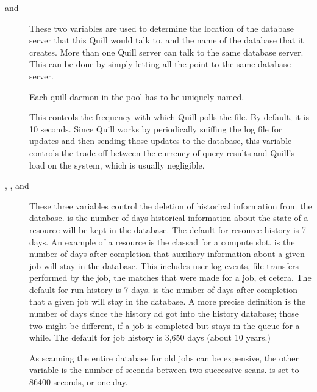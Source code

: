 \begin{description}

\item[ and ]
These two variables are used to determine the location of the database
server that this Quill would talk to, and the name of the database that
it creates.  More than one Quill server can talk to the same database
server.  This can be done by simply letting all the 
 point to the same database server.

\item[]
Each quill daemon in the pool has to be uniquely named.

\item[]
This controls the frequency with which Quill polls the
 file.  By default, it is 10 seconds.  Since Quill
works by periodically sniffing the log file for updates and then sending
those updates to the database, this variable controls the trade off between
the currency of query results and Quill's load on the system, which
is usually negligible.

\item[ , 
		, and
		]
These three variables control the deletion of historical information from the
database. 
 is the number of days
historical information about the state of a resource will be kept in the 
database. 
The default for resource history is 7 days.
An example of a resource is the classad for a compute slot.
 is the number of days
after completion that auxiliary information about a  given job will stay in 
the database.  
This includes user log events, file transfers performed by the job, the matches
that were made for a job, et cetera. 
The default for run history is 7 days.
 is the number of days
after completion that a given job will stay in the database.  
A more precise definition is the number of days since the history ad got 
into the history database; those two might be different,
if a job is completed but stays in the queue for a while.
The default for job history is 3,650 days (about 10 years.)

\item[]
As scanning the entire database for old jobs can be expensive,
the other variable 
is the number of seconds between two successive scans.  
 is set to 86400 seconds, or one day.


\end{description}
